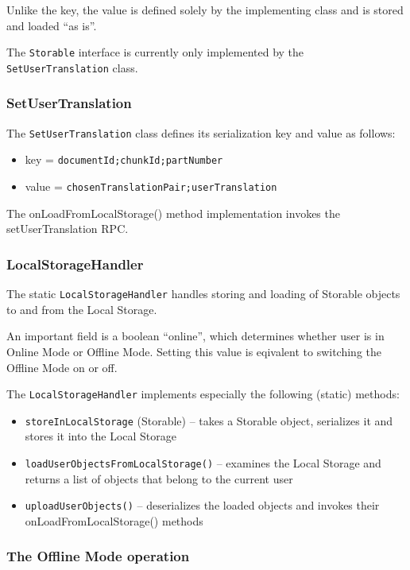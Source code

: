 Unlike the key, the value is defined solely by the implementing class and is stored and loaded ``as is''.

The {\tt Storable} interface is currently only implemented by the {\tt SetUserTranslation} class.


\subsubsection{SetUserTranslation}

The {\tt SetUserTranslation} class defines its serialization key and value as follows:

\begin{itemize}
\item key = {\tt documentId;chunkId;partNumber}
\item value = {\tt chosenTranslationPair;userTranslation}
\end{itemize}

The onLoadFromLocalStorage() method implementation invokes the setUserTranslation RPC.

\subsubsection{LocalStorageHandler}

The static {\tt LocalStorageHandler} handles storing and loading of Storable objects to and from the Local Storage.

An important field is a boolean ``online'', which determines whether user is in Online Mode or Offline Mode. Setting this value is eqivalent to switching the Offline Mode on or off.

The {\tt LocalStorageHandler} implements especially the following (static) methods:

\begin{itemize}
\item {\tt storeInLocalStorage} (Storable) -- takes a Storable object, serializes it and stores it into the Local Storage

\item {\tt loadUserObjectsFromLocalStorage()} -- examines the Local Storage and returns a list of objects that belong to the current user

\item {\tt uploadUserObjects()} -- deserializes the loaded objects and invokes their onLoadFromLocalStorage() methods
\end{itemize}

\subsubsection{The Offline Mode operation}

